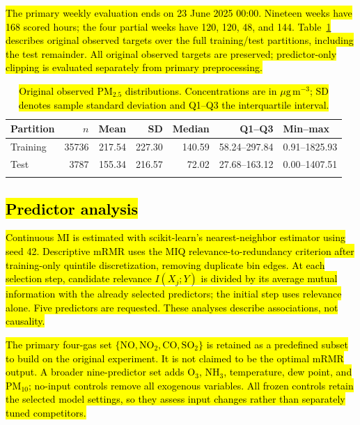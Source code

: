 \documentclass[pdflatex,sn-basic,Numbered]{sn-jnl}
\newcommand{\rev}[1]{\hl{#1}}
\newcommand{\PMunit}{\ensuremath{\mu\mathrm{g}\,\mathrm{m}^{-3}}}
\begin{document}
\rev{The primary weekly evaluation ends on 23 June 2025 00:00. Nineteen weeks have 168 scored hours; the four partial weeks have 120, 120, 48, and 144. Table~\ref{tab:descriptive} describes original observed targets over the full training/test partitions, including the test remainder. All original observed targets are preserved; predictor-only clipping is evaluated separately from primary preprocessing.}

\begin{table}[htbp]
\caption{\rev{Original observed PM$_{2.5}$ distributions. Concentrations are in \PMunit{}; SD denotes sample standard deviation and Q1--Q3 the interquartile interval.}}
\label{tab:descriptive}
\begingroup\small\setlength{\tabcolsep}{4pt}
\begin{tabularx}{\linewidth}{@{}lrrrrrX@{}}
\toprule
Partition & $n$ & Mean & SD & Median & Q1--Q3 & Min--max \\
\midrule
Training & 35736 & 217.54 & 227.30 & 140.59 & 58.24--297.84 & 0.91--1825.93 \\
Test & 3787 & 155.34 & 216.57 & 72.02 & 27.68--163.12 & 0.00--1407.51 \\
\botrule
\end{tabularx}\endgroup
\end{table}

\subsection{\texorpdfstring{\rev{Predictor analysis}}{Predictor analysis}}\label{subsec:impl_feature_selection}

\rev{Continuous MI is estimated with scikit-learn's nearest-neighbor estimator using seed 42. Descriptive mRMR uses the MIQ relevance-to-redundancy criterion after training-only quintile discretization, removing duplicate bin edges. At each selection step, candidate relevance $I(X_j;Y)$ is divided by its average mutual information with the already selected predictors; the initial step uses relevance alone. Five predictors are requested. These analyses describe associations, not causality.}

\rev{The primary four-gas set $\{\mathrm{NO},\mathrm{NO}_2,\mathrm{CO},\mathrm{SO}_2\}$ is retained as a predefined subset to build on the original experiment. It is not claimed to be the optimal mRMR output. A broader nine-predictor set adds O$_3$, NH$_3$, temperature, dew point, and PM$_{10}$; no-input controls remove all exogenous variables. All frozen controls retain the selected model settings, so they assess input changes rather than separately tuned competitors.}
\end{document}
